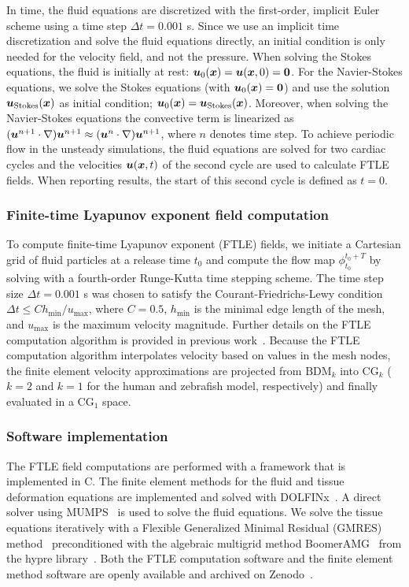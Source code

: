 \documentclass{template}
\begin{document}
In time, the fluid equations are discretized with the first-order, implicit
Euler scheme using a time step $\Delta t = 0.001$ s.
Since we use an implicit time discretization and solve the fluid equations
directly, an initial condition is only needed
for the velocity field, and not the pressure.
When solving the Stokes equations, the fluid is 
initially at rest: $\bm{u}_0(\bm{x})=\bm{u}(\bm{x}, 0)=\bm{0}$.
For the Navier-Stokes equations, we solve the Stokes equations
(with $\bm{u}_0(\bm{x})=\bm{0}$) and use the solution
$\bm{u}_{\mathrm{Stokes}}(\bm{x})$ as initial condition;
$\bm{u}_0(\bm{x})=\bm{u}_{\mathrm{Stokes}}(\bm{x})$. 
Moreover, when solving the Navier-Stokes equations the convective term
is linearized as $(\bm{u}^{n+1}\cdot\nabla)\bm{u}^{n+1} \approx (\bm{u}^n\cdot\nabla)\bm{u}^{n+1}$,
where $n$ denotes time step.
To achieve periodic flow in the unsteady simulations, the fluid equations
are solved for two cardiac cycles and the velocities $\bm{u}(\bm{x}, t)$
of the second cycle are used to calculate FTLE fields.
When reporting results, the start of this second cycle is defined as $t=0$.

\subsubsection{Finite-time Lyapunov exponent field computation}
To compute finite-time Lyapunov exponent (FTLE) fields,
we initiate a Cartesian grid of fluid particles at a release
time $t_0$ and compute the flow map $\phi_{t_0}^{t_0+T}$
by solving  with a fourth-order Runge-Kutta 
time stepping scheme. The time step size $\Delta t = 0.001$ s
was chosen to satisfy the Courant-Friedrichs-Lewy condition
$\Delta t \leq C h_{\mathrm{min}}/u_{\mathrm{max}}$,
where $C=0.5$, $h_{\mathrm{min}}$ is the minimal edge length
of the mesh, and $u_{\mathrm{max}}$ is
the maximum velocity magnitude. Further details on the
FTLE computation algorithm is provided in previous work~\cite{shadden2010computational}.
Because the FTLE computation algorithm interpolates velocity
based on values in the mesh nodes, the finite element velocity
approximations are projected from $\mathrm{BDM}_k$ into
$\mathrm{CG}_k$ ($k=2$ and $k=1$ for the human and zebrafish model, respectively)
and finally evaluated in a $\mathrm{CG}_1$ space.

\subsubsection{Software implementation}
The FTLE field computations are performed with a 
framework that is implemented in C.
The finite element methods for the fluid and tissue deformation equations
are implemented and solved with DOLFINx~\cite{baratta2023dolfinx}.
A direct solver using MUMPS~\cite{Amestoy2011Mumps} is used to solve the fluid equations.
We solve the tissue equations iteratively with a
Flexible Generalized Minimal Residual (GMRES) method~\cite{fgmres} 
preconditioned with the algebraic multigrid method
BoomerAMG~\cite{yang2002boomeramg} from the hypre library~\cite{hypre}. 
Both the FTLE computation software and the finite element method software
are openly available and archived on Zenodo~\cite{zenodoArchive}.
\end{document}
